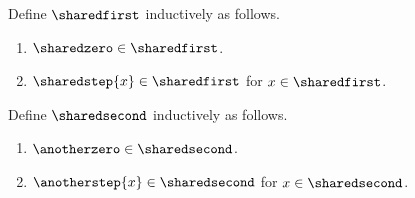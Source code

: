 \begin{datatype}\label{shared_first}
    Define $\sharedfirst$ inductively as follows.
    \begin{enumerate}
        \item $\sharedzero \in \sharedfirst$.
        \item $\sharedstep{x} \in \sharedfirst$ for $x \in \sharedfirst$.
    \end{enumerate}
\end{datatype}

\begin{datatype}\label{shared_second}
    Define $\sharedsecond$ inductively as follows.
    \begin{enumerate}
        \item $\anotherzero \in \sharedsecond$.
        \item $\anotherstep{x} \in \sharedsecond$ for $x \in \sharedsecond$.
    \end{enumerate}
\end{datatype}
